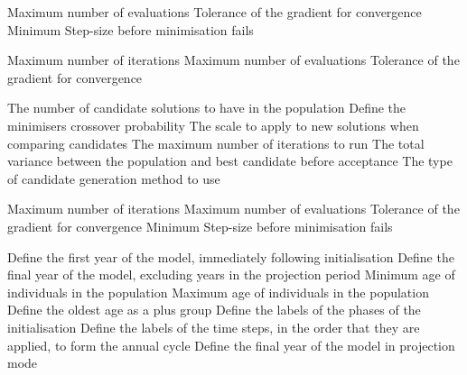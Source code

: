  {Maximum number of evaluations}
 {Tolerance of the gradient for convergence}
 {Minimum Step-size before minimisation fails}
\par\textbf{}\par
{} {Maximum number of iterations}
 {Maximum number of evaluations}
 {Tolerance of the gradient for convergence}
\par\textbf{}\par
\par\textbf{}\par
{} {The number of candidate solutions to have in the population}
 {Define the minimisers crossover probability}
 {The scale to apply to new solutions when comparing candidates}
 {The maximum number of iterations to run}
 {The total variance between the population and best candidate before acceptance}
 {The type of candidate generation method to use}
\par\textbf{}\par
\par\textbf{}\par
{} {Maximum number of iterations}
 {Maximum number of evaluations}
 {Tolerance of the gradient for convergence}
 {Minimum Step-size before minimisation fails}
\par\par
{} {Define the first year of the model, immediately following initialisation}
 {Define the final year of the model, excluding years in the projection period}
 {Minimum age of individuals in the population}
 {Maximum age of individuals in the population}
 {Define the oldest age as a plus group}
 {Define the labels of the phases of the initialisation}
 {Define the labels of the time steps, in the order that they are applied, to form the annual cycle}
 {Define the final year of the model in projection mode}
